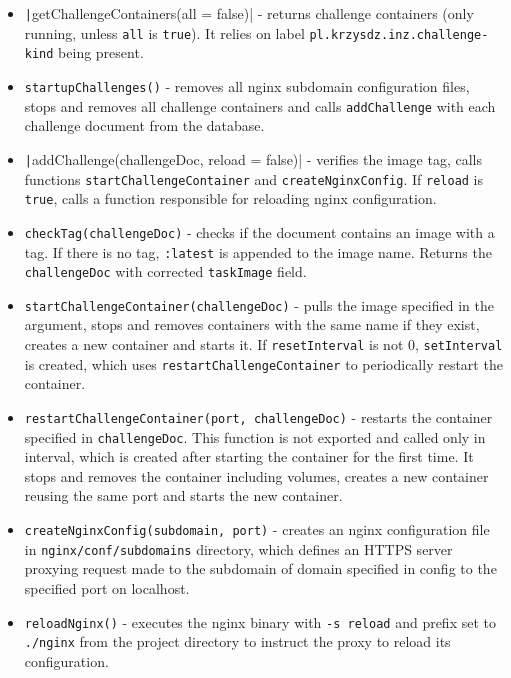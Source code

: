 \begin{itemize}
    \item \texttt|getChallengeContainers(all = false)| - returns challenge containers (only running, unless \texttt{all} is \texttt{true}). It relies on label \texttt{pl.krzysdz.inz.challenge-kind} being present.
    \item \texttt{startupChallenges()} - removes all nginx subdomain configuration files, stops and removes all challenge containers and calls \texttt{addChallenge} with each challenge document from the database.
    \item \texttt|addChallenge(challengeDoc, reload = false)| - verifies the image tag, calls functions \texttt{startChallengeContainer} and \texttt{createNginxConfig}. If \texttt{reload} is \texttt{true}, calls a function responsible for reloading nginx configuration.
    \item \texttt{checkTag(challengeDoc)} - checks if the document contains an image with a tag. If there is no tag, \texttt{:latest} is appended to the image name. Returns the \texttt{challengeDoc} with corrected \texttt{taskImage} field.
    \item \texttt{startChallengeContainer(challengeDoc)} - pulls the image specified in the argument, stops and removes containers with the same name if they exist, creates a new container and starts it. If \texttt{resetInterval} is not 0, \texttt{setInterval} is created, which uses \texttt{restartChallengeContainer} to periodically restart the container.
    \item \texttt{restartChallengeContainer(port, challengeDoc)} - restarts the container specified in \texttt{challengeDoc}. This function is not exported and called only in interval, which is created after starting the container for the first time. It stops and removes the container including volumes, creates a new container reusing the same port and starts the new container.
    \item \texttt{createNginxConfig(subdomain, port)} - creates an nginx configuration file in \texttt{nginx/conf/subdomains} directory, which defines an HTTPS server proxying request made to the subdomain of domain specified in config to the specified port on localhost.
    \item \texttt{reloadNginx()} - executes the nginx binary with \texttt{-s reload} and prefix set to \texttt{./nginx} from the project directory to instruct the proxy to reload its configuration.
\end{itemize}
